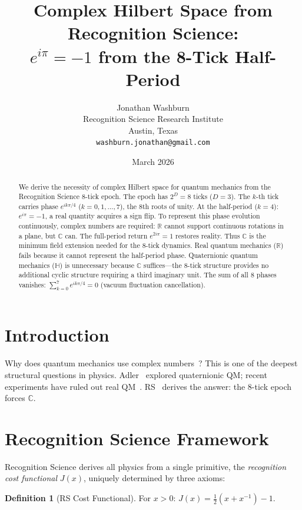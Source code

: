 \documentclass[12pt,a4paper]{article}
\title{Complex Hilbert Space from Recognition Science:\\
$e^{i\pi} = -1$ from the 8-Tick Half-Period}
\author{Jonathan Washburn\\
Recognition Science Research Institute\\
Austin, Texas\\
\texttt{washburn.jonathan@gmail.com}}
\date{March 2026}
\theoremstyle{definition}
\newtheorem{definition}[theorem]{Definition}
\theoremstyle{remark}
\begin{document}
\maketitle

\begin{abstract}
We derive the necessity of complex Hilbert space for quantum
mechanics from the Recognition Science 8-tick epoch.  The epoch has
$2^D = 8$ ticks ($D = 3$).  The $k$-th tick carries phase
$e^{ik\pi/4}$ ($k = 0, 1, \ldots, 7$), the 8th roots of unity.
At the half-period ($k = 4$): $e^{i\pi} = -1$, a real quantity
acquires a sign flip.  To represent this phase evolution continuously,
complex numbers are required: $\mathbb{R}$ cannot support continuous
rotations in a plane, but $\mathbb{C}$ can.  The full-period return
$e^{2i\pi} = 1$ restores reality.  Thus $\mathbb{C}$ is the minimum
field extension needed for the 8-tick dynamics.  Real quantum mechanics
($\mathbb{R}$) fails because it cannot represent the half-period
phase.  Quaternionic quantum mechanics ($\mathbb{H}$) is unnecessary
because $\mathbb{C}$ suffices---the 8-tick structure provides no
additional cyclic structure requiring a third imaginary unit.  The sum
of all 8 phases vanishes: $\sum_{k=0}^7 e^{ik\pi/4} = 0$ (vacuum
fluctuation cancellation).
\end{abstract}

\section{Introduction}

Why does quantum mechanics use complex numbers~\cite{Stueckelberg}?
This is one of the deepest structural questions in physics.  Adler~\cite{Adler} explored quaternionic QM; recent experiments have ruled out
real QM~\cite{Renou}.  RS~\cite{RS_Axioms} derives the answer: the 8-tick
epoch forces $\mathbb{C}$.

\section{Recognition Science Framework}
\label{sec:framework}

Recognition Science derives all physics from a single primitive,
the \emph{recognition cost functional} $J(x)$, uniquely determined
by three axioms:

\begin{definition}[RS Cost Functional]
For $x > 0$: $J(x) = \tfrac{1}{2}(x + x^{-1}) - 1$.
\end{definition}
\end{document}
